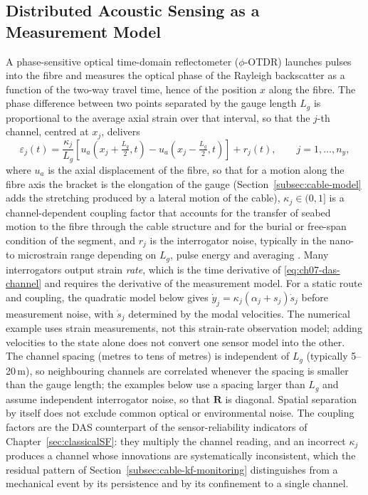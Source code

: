 \subsection{Distributed Acoustic Sensing as a Measurement Model}
\label{subsec:das-measurement-model}
A phase-sensitive optical time-domain reflectometer ($\phi$-OTDR) launches pulses into the fibre and measures the optical phase of the Rayleigh backscatter as a function of the two-way travel time, hence of the position $x$ along the fibre. The phase difference between two points separated by the gauge length $L_g$ is proportional to the average axial strain over that interval, so that the $j$-th channel, centred at $x_j$, delivers
\begin{equation}
\varepsilon_j(t)=\frac{\kappa_j}{L_g}\left[u_a(x_j+\tfrac{L_g}{2},t)-u_a(x_j-\tfrac{L_g}{2},t)\right]+r_j(t),
\qquad j=1,\ldots,n_y,
\label{eq:ch07-das-channel}
\end{equation}
where $u_a$ is the axial displacement of the fibre, so that for a motion along the fibre axis the bracket is the elongation of the gauge (Section~\ref{subsec:cable-model} adds the stretching produced by a lateral motion of the cable), $\kappa_j\in(0,1]$ is a channel-dependent coupling factor that accounts for the transfer of seabed motion to the fibre through the cable structure and for the burial or free-span condition of the segment, and $r_j$ is the interrogator noise, typically in the nano- to microstrain range depending on $L_g$, pulse energy and averaging \cite{hartog_intro_2017,lindsey_fiberoptic_2021}. Many interrogators output strain \emph{rate}, which is the time derivative of \eqref{eq:ch07-das-channel} and requires the derivative of the measurement model. For a static route and coupling, the quadratic model below gives $\dot y_j=\kappa_j(\alpha_j+s_j)\dot s_j$ before measurement noise, with $\dot s_j$ determined by the modal velocities. The numerical example uses strain measurements, not this strain-rate observation model; adding velocities to the state alone does not convert one sensor model into the other. The channel spacing (metres to tens of metres) is independent of $L_g$ (typically 5--20\,m), so neighbouring channels are correlated whenever the spacing is smaller than the gauge length; the examples below use a spacing larger than $L_g$ and assume independent interrogator noise, so that $\mathbf{R}$ is diagonal. Spatial separation by itself does not exclude common optical or environmental noise. The coupling factors are the DAS counterpart of the sensor-reliability indicators of Chapter~\ref{sec:classicalSF}: they multiply the channel reading, and an incorrect $\kappa_j$ produces a channel whose innovations are systematically inconsistent, which the residual pattern of Section~\ref{subsec:cable-kf-monitoring} distinguishes from a mechanical event by its persistence and by its confinement to a single channel.



